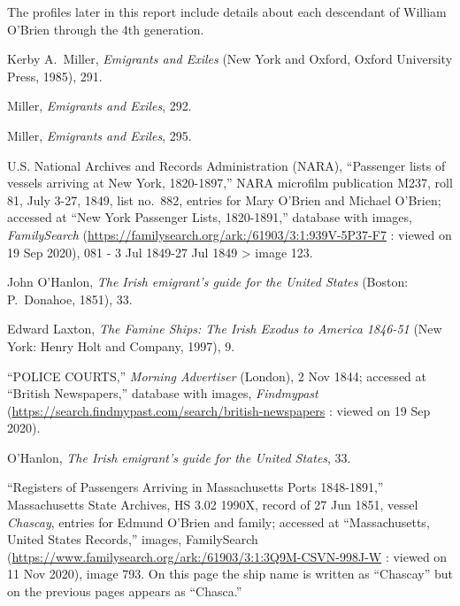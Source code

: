 The profiles later in this report include details about each descendant of William O'Brien through the 4th generation.

\begin{thebibliography}{999}
	

Kerby A.\ Miller, \textit{Emigrants and Exiles} (New York and Oxford, Oxford University Press, 1985), 291.

Miller, \textit{Emigrants and Exiles}, 292.

Miller, \textit{Emigrants and Exiles}, 295.

U.S. National Archives and Records Administration (NARA), ``Passenger lists of vessels arriving at New York, 1820-1897,'' NARA microfilm publication M237, roll 81, July 3-27, 1849, list no.\ 882, entries for Mary O'Brien and Michael O'Brien; accessed at ``New York Passenger Lists, 1820-1891,'' database with images, \textit{FamilySearch} (\url{https://familysearch.org/ark:/61903/3:1:939V-5P37-F7} : viewed on 19 Sep 2020), 081 - 3 Jul 1849-27 Jul 1849 > image 123.

John O'Hanlon, \textit{The Irish emigrant's guide for the United States} (Boston: P.\ Donahoe, 1851), 33.

Edward Laxton, \textit{The Famine Ships: The Irish Exodus to America 1846-51} (New York: Henry Holt and Company, 1997), 9. 

``POLICE COURTS,'' \textit{Morning Advertiser} (London), 2 Nov 1844; accessed at ``British Newspapers,'' database with images, \textit{Findmypast} (\url{https://search.findmypast.com/search/british-newspapers} : viewed on 19 Sep 2020).

O'Hanlon, \textit{The Irish emigrant's guide for the United States}, 33.

``Registers of Passengers Arriving in Massachusetts Ports 1848-1891,'' Massachusetts State Archives, HS 3.02 1990X, record of 27 Jun 1851, vessel \textit{Chascay}, entries for Edmund O'Brien and family; accessed at ``Massachusetts, United States Records,'' images, FamilySearch (\url{https://www.familysearch.org/ark:/61903/3:1:3Q9M-CSVN-998J-W} : viewed on 11 Nov 2020), image 793. On this page the ship name is written as ``Chascay'' but on the previous pages appears as ``Chasca.''


\end{thebibliography}
